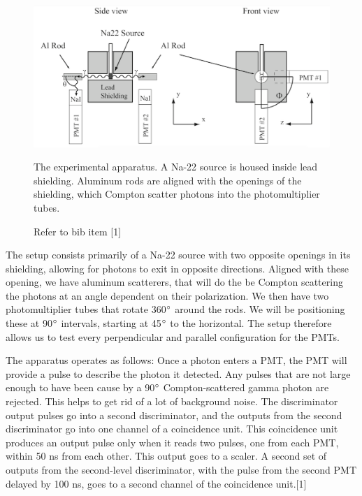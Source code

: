 \documentclass{article}
\begin{document}
\begin{figure}[!htb]
	\centering
	\includegraphics[scale=.5]{apparatus.png}
  	\caption{The experimental apparatus. A Na-22 source is housed inside lead shielding. Aluminum rods are aligned with the openings of the shielding, which Compton scatter photons into the photomultiplier tubes.}
	\caption{Refer to bib item [1]}
 	\label{Apparatus}
\end{figure}

The setup consists primarily of a Na-22 source with two opposite openings in its shielding, allowing for photons to exit in opposite directions. Aligned with these opening, we have aluminum scatterers, that will do the be Compton scattering the photons at an angle dependent on their polarization. We then have two photomultiplier tubes that rotate 360$\degree$ around the rods. We will be positioning these at 90$\degree$ intervals, starting at 45$\degree$ to the horizontal. The setup therefore allows us to test every perpendicular and parallel configuration for the PMTs.

The apparatus operates as follows: Once a photon enters a PMT, the PMT will provide a pulse to describe the photon it detected. Any pulses that are not large enough to have been cause by a 90$\degree$ Compton-scattered gamma photon are rejected. This helps to get rid of a lot of background noise. The discriminator output pulses go into a second discriminator, and the outputs from the second discriminator go into one channel of a coincidence unit. This coincidence unit produces an output pulse only when it reads two pulses, one from each PMT, within 50 ns from each other. This output goes to a scaler.
A second set of outputs from the second-level discriminator, with the pulse from the second PMT delayed by 100 ns, goes to a second channel of the coincidence unit.[1]

\hspace{.25cm}
\end{document}
